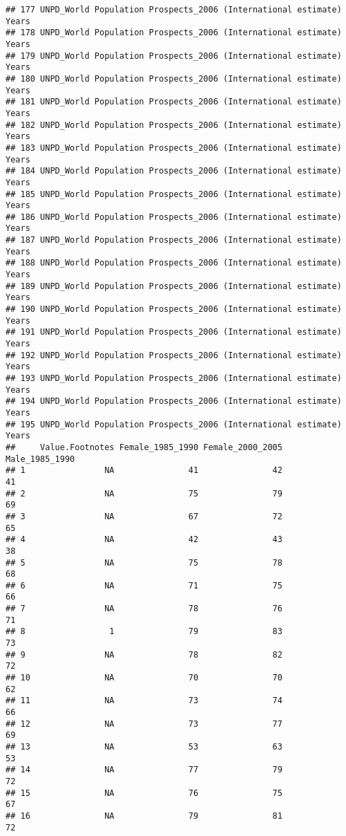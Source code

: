 \documentclass[]{article}
\begin{document}
\begin{verbatim}
## 177 UNPD_World Population Prospects_2006 (International estimate) Years
## 178 UNPD_World Population Prospects_2006 (International estimate) Years
## 179 UNPD_World Population Prospects_2006 (International estimate) Years
## 180 UNPD_World Population Prospects_2006 (International estimate) Years
## 181 UNPD_World Population Prospects_2006 (International estimate) Years
## 182 UNPD_World Population Prospects_2006 (International estimate) Years
## 183 UNPD_World Population Prospects_2006 (International estimate) Years
## 184 UNPD_World Population Prospects_2006 (International estimate) Years
## 185 UNPD_World Population Prospects_2006 (International estimate) Years
## 186 UNPD_World Population Prospects_2006 (International estimate) Years
## 187 UNPD_World Population Prospects_2006 (International estimate) Years
## 188 UNPD_World Population Prospects_2006 (International estimate) Years
## 189 UNPD_World Population Prospects_2006 (International estimate) Years
## 190 UNPD_World Population Prospects_2006 (International estimate) Years
## 191 UNPD_World Population Prospects_2006 (International estimate) Years
## 192 UNPD_World Population Prospects_2006 (International estimate) Years
## 193 UNPD_World Population Prospects_2006 (International estimate) Years
## 194 UNPD_World Population Prospects_2006 (International estimate) Years
## 195 UNPD_World Population Prospects_2006 (International estimate) Years
##     Value.Footnotes Female_1985_1990 Female_2000_2005 Male_1985_1990
## 1                NA               41               42             41
## 2                NA               75               79             69
## 3                NA               67               72             65
## 4                NA               42               43             38
## 5                NA               75               78             68
## 6                NA               71               75             66
## 7                NA               78               76             71
## 8                 1               79               83             73
## 9                NA               78               82             72
## 10               NA               70               70             62
## 11               NA               73               74             66
## 12               NA               73               77             69
## 13               NA               53               63             53
## 14               NA               77               79             72
## 15               NA               76               75             67
## 16               NA               79               81             72

\end{verbatim}
\end{document}

